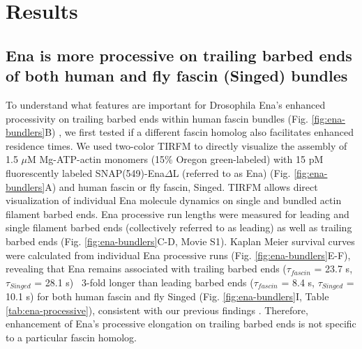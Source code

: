 \section{Results}\label{ch02-results}

\subsection{Ena is more processive on trailing barbed ends of both human and fly fascin (Singed) bundles}\label{ena-processive-fascin-singed}
To understand what features are important for Drosophila Ena's enhanced processivity on trailing barbed ends within human fascin bundles (Fig. \ref{fig:ena-bundlers}B) \citep{winkelman_ena/vasp_2014}, we first tested if a different fascin homolog also facilitates enhanced residence times. We used two-color TIRFM to directly visualize the assembly of 1.5 $\mu$M Mg-ATP-actin monomers (15\% Oregon green-labeled) with 15 pM fluorescently labeled SNAP(549)-Ena$\Delta$L (referred to as Ena) (Fig. \ref{fig:ena-bundlers}A) and human fascin or fly fascin, Singed. TIRFM allows direct visualization of individual Ena molecule dynamics on single and bundled actin filament barbed ends. Ena processive run lengths were measured for leading and single filament barbed ends (collectively referred to as leading) as well as trailing barbed ends (Fig. \ref{fig:ena-bundlers}C-D, Movie S1). Kaplan Meier survival curves were calculated from individual Ena processive runs (Fig. \ref{fig:ena-bundlers}E-F), revealing that Ena remains associated with trailing barbed ends ($\tau_{fascin}$ = 23.7 s, $\tau_{Singed}$ = 28.1 s) ~3-fold longer than leading barbed ends ($\tau_{fascin}$ = 8.4 s, $\tau_{Singed}$ = 10.1 s) for both human fascin and fly Singed (Fig. \ref{fig:ena-bundlers}I, Table \ref{tab:ena-processive}), consistent with our previous findings \citep{winkelman_ena/vasp_2014}. Therefore, enhancement of Ena's processive elongation on trailing barbed ends is not specific to a particular fascin homolog.

